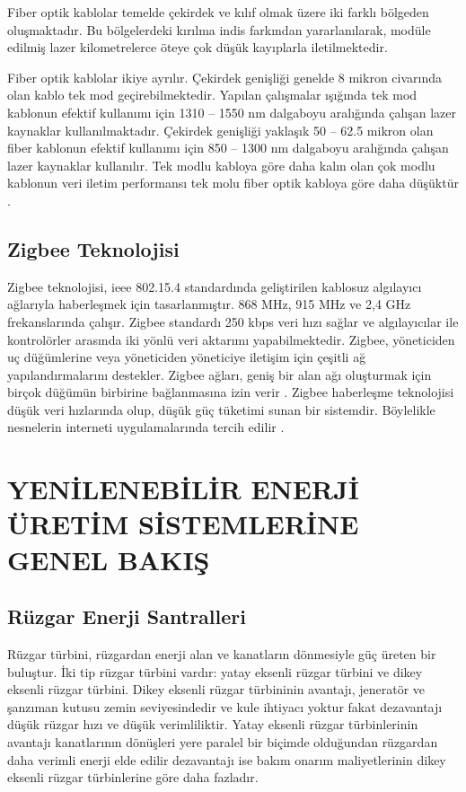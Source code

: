Fiber optik kablolar temelde çekirdek ve kılıf olmak üzere iki farklı bölgeden oluşmaktadır. Bu bölgelerdeki kırılma indis farkından yararlanılarak, modüle edilmiş lazer kilometrelerce öteye çok düşük kayıplarla iletilmektedir. \cite{agrawal2012fiber}

Fiber optik kablolar ikiye ayrılır. Çekirdek genişliği genelde 8 mikron civarında olan kablo tek mod geçirebilmektedir. Yapılan çalışmalar ışığında tek mod kablonun efektif kullanımı için 1310 -- 1550 nm dalgaboyu aralığında çalışan lazer kaynaklar kullanılmaktadır. Çekirdek genişliği yaklaşık 50 -- 62.5 mikron olan fiber kablonun efektif kullanımı için 850 -- 1300 nm dalgaboyu aralığında çalışan lazer kaynaklar kullanılır. Tek modlu kabloya göre daha kalın olan çok modlu kablonun veri iletim performansı tek molu fiber optik kabloya göre daha düşüktür \cite{keiser2000optical}. 

\subsection{Zigbee Teknolojisi}


Zigbee teknolojisi, \gls{ieee} 802.15.4 standardında geliştirilen kablosuz algılayıcı ağlarıyla haberleşmek için tasarlanmıştır. 868 MHz, 915 MHz ve 2,4 GHz frekanslarında çalışır. Zigbee standardı 250 kbps veri hızı sağlar ve algılayıcılar ile kontrolörler arasında iki yönlü veri aktarımı yapabilmektedir. Zigbee, yöneticiden uç düğümlerine veya yöneticiden yöneticiye iletişim için çeşitli ağ yapılandırmalarını destekler. Zigbee ağları, geniş bir alan ağı oluşturmak için birçok düğümün birbirine bağlanmasına izin verir \cite{ramya2011study}. Zigbee haberleşme teknolojisi düşük veri hızlarında olup, düşük güç tüketimi sunan bir sistemdir. Böylelikle nesnelerin interneti uygulamalarında tercih edilir \cite{alliance2010zigbee}.



\section{YENİLENEBİLİR ENERJİ ÜRETİM SİSTEMLERİNE GENEL BAKIŞ}

\subsection{Rüzgar Enerji Santralleri}
Rüzgar türbini,  rüzgardan  enerji alan ve kanatların dönmesiyle güç üreten bir buluştur. İki tip rüzgar türbini vardır: yatay eksenli rüzgar türbini ve dikey eksenli rüzgar türbini. Dikey eksenli rüzgar türbininin avantajı, jeneratör ve şanzıman kutusu zemin seviyesindedir ve kule ihtiyacı yoktur fakat dezavantajı düşük rüzgar hızı ve düşük verimliliktir. Yatay eksenli rüzgar türbinlerinin avantajı kanatlarının dönüşleri yere paralel bir biçimde olduğundan rüzgardan daha verimli enerji elde edilir dezavantajı ise bakım onarım maliyetlerinin dikey eksenli rüzgar türbinlerine göre daha fazladır. \cite{Ghenai2012LifeCA}

